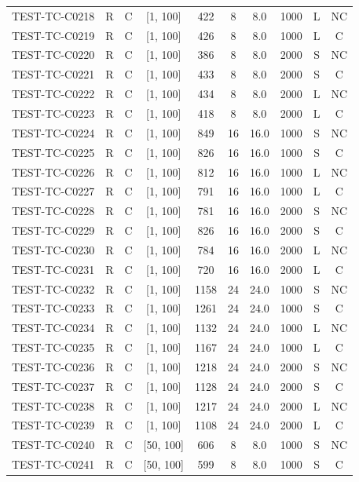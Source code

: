 \begin{longtable}{lccccccccc}
TEST-TC-C0218 & R & C & [1, 100] & 422 & 8 & 8.0 & 1000 & L & NC \\
TEST-TC-C0219 & R & C & [1, 100] & 426 & 8 & 8.0 & 1000 & L & C \\
TEST-TC-C0220 & R & C & [1, 100] & 386 & 8 & 8.0 & 2000 & S & NC \\
TEST-TC-C0221 & R & C & [1, 100] & 433 & 8 & 8.0 & 2000 & S & C \\
TEST-TC-C0222 & R & C & [1, 100] & 434 & 8 & 8.0 & 2000 & L & NC \\
TEST-TC-C0223 & R & C & [1, 100] & 418 & 8 & 8.0 & 2000 & L & C \\
TEST-TC-C0224 & R & C & [1, 100] & 849 & 16 & 16.0 & 1000 & S & NC \\
TEST-TC-C0225 & R & C & [1, 100] & 826 & 16 & 16.0 & 1000 & S & C \\
TEST-TC-C0226 & R & C & [1, 100] & 812 & 16 & 16.0 & 1000 & L & NC \\
TEST-TC-C0227 & R & C & [1, 100] & 791 & 16 & 16.0 & 1000 & L & C \\
TEST-TC-C0228 & R & C & [1, 100] & 781 & 16 & 16.0 & 2000 & S & NC \\
TEST-TC-C0229 & R & C & [1, 100] & 826 & 16 & 16.0 & 2000 & S & C \\
TEST-TC-C0230 & R & C & [1, 100] & 784 & 16 & 16.0 & 2000 & L & NC \\
TEST-TC-C0231 & R & C & [1, 100] & 720 & 16 & 16.0 & 2000 & L & C \\
TEST-TC-C0232 & R & C & [1, 100] & 1158 & 24 & 24.0 & 1000 & S & NC \\
TEST-TC-C0233 & R & C & [1, 100] & 1261 & 24 & 24.0 & 1000 & S & C \\
TEST-TC-C0234 & R & C & [1, 100] & 1132 & 24 & 24.0 & 1000 & L & NC \\
TEST-TC-C0235 & R & C & [1, 100] & 1167 & 24 & 24.0 & 1000 & L & C \\
TEST-TC-C0236 & R & C & [1, 100] & 1218 & 24 & 24.0 & 2000 & S & NC \\
TEST-TC-C0237 & R & C & [1, 100] & 1128 & 24 & 24.0 & 2000 & S & C \\
TEST-TC-C0238 & R & C & [1, 100] & 1217 & 24 & 24.0 & 2000 & L & NC \\
TEST-TC-C0239 & R & C & [1, 100] & 1108 & 24 & 24.0 & 2000 & L & C \\
TEST-TC-C0240 & R & C & [50, 100] & 606 & 8 & 8.0 & 1000 & S & NC \\
TEST-TC-C0241 & R & C & [50, 100] & 599 & 8 & 8.0 & 1000 & S & C \\

\end{longtable}
